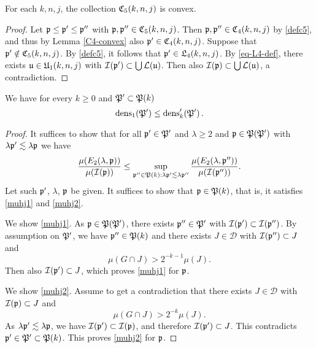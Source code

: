 {\begin{lemma}[C5 convex]
    \label{C5-convex}
    For each $k,n,j$, the collection ${\mathfrak C}_5(k,n,j)$ is convex.
\end{lemma}

\begin{proof}
    Let ${\mathfrak p} \le {\mathfrak p}' \le{\mathfrak p}''$ with ${\mathfrak p}, {\mathfrak p}'' \in {\mathfrak C}_5(k,n,j)$. Then ${\mathfrak p}, {\mathfrak p}'' \in {\mathfrak C}_4(k,n,j)$ by \eqref{defc5}, and thus by Lemma \ref{C4-convex} also ${\mathfrak p}' \in {\mathfrak C}_4(k,n,j)$. Suppose that ${\mathfrak p}' \notin {\mathfrak C}_5(k,n,j)$. By \eqref{defc5}, it follows that ${\mathfrak p}' \in {\mathfrak L}_4(k,n,j)$.
    By \eqref{eq-L4-def}, there exists ${\mathfrak u} \in {\mathfrak U}_1(k,n,j)$ with ${\mathcal{I}}({\mathfrak p}') \subset \bigcup \mathcal{L}({\mathfrak u})$. Then also ${\mathcal{I}}({\mathfrak p}) \subset \bigcup \mathcal{L}({\mathfrak u})$, a contradiction.
\end{proof}

\begin{lemma}
    \label{dens-compare}

    We have for every $k\ge 0$ and ${\mathfrak P}'\subset {\mathfrak P}(k)$
\begin{equation}
    \operatorname{\operatorname{dens}}_1({\mathfrak P}')\le \operatorname{\operatorname{dens}}_k'({\mathfrak P}')\, .
\end{equation}
\end{lemma}
\begin{proof}
It suffices to show that for all ${\mathfrak p}'\in {\mathfrak P}'$
and  $\lambda\ge 2$ and  ${\mathfrak p}\in {\mathfrak P}({\mathfrak P}')$ with $\lambda {\mathfrak p}' \lesssim \lambda {\mathfrak p}$ we have
\begin{equation}
    \frac{\mu({E}_2(\lambda, {\mathfrak p}))}{\mu({\mathcal{I}}({\mathfrak p}))}
    \le \sup_{{\mathfrak p}'' \in {\mathfrak P}(k): \lambda {\mathfrak p}' \lesssim \lambda {\mathfrak p}''}
    \frac{\mu({E}_2(\lambda, {\mathfrak p}''))}{\mu({\mathcal{I}}({\mathfrak p}''))}.
\end{equation}
    Let such ${\mathfrak p}'$, $\lambda$, ${\mathfrak p}$ be given.
    It suffices to show that ${\mathfrak p}\in {\mathfrak P}(k)$,
    that is, it satisfies \eqref{muhj1}
    and \eqref{muhj2}.

We show \eqref{muhj1}.
 As ${\mathfrak p}\in {\mathfrak P}({\mathfrak P}')$, there exists
${\mathfrak p}''\in {\mathfrak P}'$ with ${\mathcal{I}}({\mathfrak p}')\subset {\mathcal{I}}({\mathfrak p}'')$. By assumption on ${\mathfrak P}'$, we have  ${\mathfrak p}''\in {\mathfrak P}(k)$ and there exists
$J\in \mathcal{D}$ with
   ${\mathcal{I}}({\mathfrak p}'')\subset J$ and
   \begin{equation}
       \mu(G\cap J)>2^{-k-1} \mu(J).
   \end{equation}
Then also ${\mathcal{I}}({\mathfrak p}')\subset J$, which proves
\eqref{muhj1} for ${\mathfrak p}$.

We show \eqref{muhj2}. Assume to get a contradiction that
there exists $J\in \mathcal{D}$ with
   ${\mathcal{I}}({\mathfrak p})\subset J$ and
   \begin{equation}\label{mugj}
       \mu(G\cap J)>2^{-k} \mu(J).
   \end{equation}
   As $\lambda{\mathfrak p}'\lesssim \lambda{\mathfrak p}$, we have ${\mathcal{I}}({\mathfrak p}')\subset {\mathcal{I}}({\mathfrak p})$, and therefore
    ${\mathcal{I}}({\mathfrak p}')\subset J$. This contradicts
   ${\mathfrak p}'\in {\mathfrak P}'\subset {\mathfrak P}(k)$. This proves
\eqref{muhj2} for ${\mathfrak p}$.
\end{proof}

}
